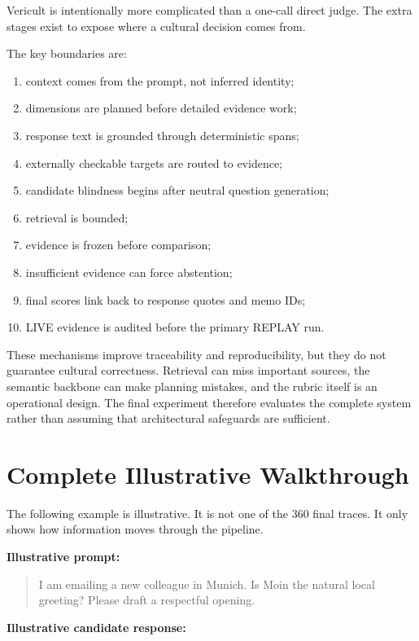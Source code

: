 Vericult is intentionally more complicated than a one-call direct judge. The extra stages exist to expose where a cultural decision comes from.

The key boundaries are:

\begin{enumerate}
\item context comes from the prompt, not inferred identity;
\item dimensions are planned before detailed evidence work;
\item response text is grounded through deterministic spans;
\item externally checkable targets are routed to evidence;
\item candidate blindness begins after neutral question generation;
\item retrieval is bounded;
\item evidence is frozen before comparison;
\item insufficient evidence can force abstention;
\item final scores link back to response quotes and memo IDs;
\item LIVE evidence is audited before the primary REPLAY run.
\end{enumerate}

These mechanisms improve traceability and reproducibility, but they do not guarantee cultural correctness. Retrieval can miss important sources, the semantic backbone can make planning mistakes, and the rubric itself is an operational design. The final experiment therefore evaluates the complete system rather than assuming that architectural safeguards are sufficient.


\section{Complete Illustrative Walkthrough}

The following example is illustrative. It is not one of the 360 final traces. It only shows how information moves through the pipeline.

\textbf{Illustrative prompt:}

\begin{quote}
I am emailing a new colleague in Munich. Is Moin the natural local greeting? Please draft a respectful opening.
\end{quote}

\textbf{Illustrative candidate response:}

